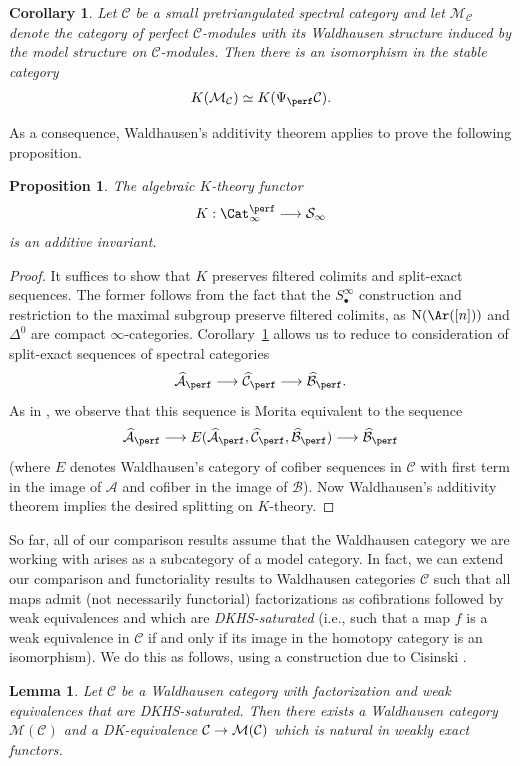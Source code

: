 \documentclass{amsart}
\newcommand{\ssdot}{\bullet}%
\newcommand{\iSdot}[1][\ssdot]{S^{\infty}_{#1}}
\newcommand{\htp}{\simeq}
\renewcommand{\to}{\mathchoice{\longrightarrow}{\rightarrow}{\rightarrow}{\rightarrow}}
\let\catsymbfont\mathcal
\newcommand{\aA}{{\catsymbfont{A}}}
\newcommand{\aB}{{\catsymbfont{B}}}
\newcommand{\aC}{{\catsymbfont{C}}}
\newcommand{\aM}{{\catsymbfont{M}}}
\newcommand{\aS}{{\catsymbfont{S}}}
\newcommand{\N}{\mathrm{N}}
\newcommand{\idemstabcat}{\Cat_\i^{\perf}}
\newcommand{\ispec}{\aS_{\infty}}
\newcommand{\too}{\longrightarrow}%
\renewcommand{\i}{\infty}
\numberwithin{equation}{section}
\newtheorem{corollary}[equation]{Corollary}
\newtheorem{lemma}[equation]{Lemma}
\newtheorem{proposition}[equation]{Proposition}
\theoremstyle{definition}
\begin{document}
\begin{corollary}\label{cor:kconsistency}
Let $\aC$ be a small pretriangulated spectral category and let
$\aM_{\aC}$ denote the category of perfect $\aC$-modules with its
Waldhausen structure induced by the model structure on $\aC$-modules.
Then there is an isomorphism in the stable category
 \[
K(\aM_{\aC}) \htp K(\Psi_{\perf}\aC).
\]
\end{corollary}

As a consequence, Waldhausen's additivity theorem applies to prove the
following proposition.

\begin{proposition}
The algebraic $K$-theory functor
\[
K:\idemstabcat\too\ispec
\]
is an additive invariant. 
\end{proposition}

\begin{proof} 
It suffices to show that $K$ preserves filtered colimits and split-exact sequences.
The former follows from the fact that the $\iSdot$ construction and restriction to the maximal subgroup preserve filtered colimits, as $\N(\Ar([n]))$ and $\Delta^0$ are compact $\i$-categories.  Corollary~\ref{cor:kconsistency} allows us to reduce to
consideration of split-exact sequences of spectral categories
\[
\widehat{\aA}_{\perf} \to \widehat{\aC}_{\perf} \to \widehat{\aB}_{\perf}.
\]
As in \cite{Matrix}, we observe that this sequence is Morita
equivalent to the sequence
\[
\widehat{\aA}_{\perf} \to E(\widehat{\aA}_{\perf}, \widehat{\aC}_{\perf}, \widehat{\aB}_{\perf}) \to \widehat{\aB}_{\perf}
\]
(where $E$ denotes Waldhausen's category of cofiber sequences in $\aC$
with first term in the image of $\aA$ and cofiber in the image of
$\aB$).  Now Waldhausen's additivity theorem implies the desired
splitting on $K$-theory.
\end{proof}

So far, all of our comparison results assume that the Waldhausen
category we are working with arises as a subcategory of a model
category.  In fact, we can extend our comparison and functoriality
results to Waldhausen categories $\aC$ such that all maps admit
(not necessarily functorial) factorizations as cofibrations followed
by weak equivalences and which are {\em
DKHS-saturated} (i.e., such that a map $f$ is a weak equivalence in
$\aC$ if and only if its image in the homotopy category is an
isomorphism).  We do this as follows, using a construction due to
Cisinski \cite[\S 4]{Cisinski}.

\begin{lemma}\label{lem:cis}
Let $\aC$ be a Waldhausen category with factorization and weak
equivalences that are DKHS-saturated.  Then there exists a Waldhausen
category $\aM(\aC)$ and a DK-equivalence $\aC \to \aM(\aC)$ which is
natural in weakly exact functors.
\end{lemma}
\end{document}
